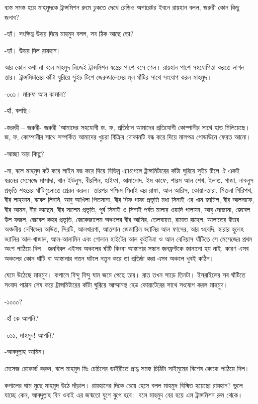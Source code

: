 \documentclass[
]{book}
\begin{document}
ব্যস্ত সমস্ত হয়ে মাহমুদকে ট্রান্সমিশন রুমে ঢুকতে দেখে রেডিও অপারেটর ইবনে রায়হান বলল, জরুরী কোন কিছু জনাব?

-হ্যাঁ। সংক্ষিপ্ত উত্তর দিয়ে মাহমুদ বলল, সব ঠিক আছে তো?

-হ্যাঁ। উত্তর দিল রায়হান।

আর কোন কথা না বলে মাহমুদ নিজেই ট্রান্সমিশন যন্ত্রের পাশে বসে গেল। রায়হান পাশে সহযোগিতা করতে লাগল তার। ট্রান্সমিটারের কাঁটা ঘুরিয়ে সুইচ টিপে জেরুজালেমের মূল ঘাঁটির সাথে সংযোগ করল মাহমুদ।

-০০১। মারুফ আল কামাল?

-হাঁ, বলছি।

-জরুরী -- জরুরী- জরুরী 'আমাদের সহযোগী জ, ফ, প্রতিষ্ঠান আমাদের প্রতিযোগী কোম্পানীর সাথে হাত মিলিয়েছে। জ, ফ, কোম্পানীর সাথে সম্পর্কিত আমাদের খুচরা বিক্রির দোকানটি বন্ধ করে দিয়ে মালপত্র গোডাউনে ফেরত আনো।

-আচ্ছা আর কিছু?

-না, বলে মাহমুদ কট করে লাইন বন্ধ করে দিয়ে বিভিন্ন এ্যাংগেলে ট্রান্সমিটারের কাঁটা ঘুরিয়ে সুইচ টিপে ঐ একই ধরনের মেসেজে মাসাদা, খান ইউনুস, বীরশিন, হাইফা, আমাদোদ, ইম কাফে, শারম আল শেখ, ইলাত, গাজা, নাবলুস প্রভৃতি শহরের ঘাঁটিগুলোতে প্রেরন করল। তারপর পশ্চিম সিনাই এর রাফা, আল আরিস, কোয়ানতারা, মিতলা গিরিপথ, বীর লাহফান, ববেল লিবনি, আবু আখিলা পিতসানা, বীর গিফ গাফা প্রভৃতি মধ্য সিনাই এর খান জামিল, বীর আলনাফে, বীর আমন, বীর কাছেম, বীর সালেম প্রভৃতি, পূর্ব সিনাই ও সিনাই পর্বত মালার ওয়াদি গালাফা, আবু দোজানা, জেবেল উল ফজল, জেবেল কহর প্রভৃতি, জেরেুজালেম অঞ্চলের বীর আসির, তেলবায়ত, রামাত রাহেল, আলাতের উত্তর অঞ্চলীয় নেগিভের আউত, সিরটি, আলখারগা, আতসান জেজারিল ভ্যালির আল ফাসের, আর ওবেদি, হারার হুলেহ ভ্যালির আল-খাজাল, আল-আলামিন এবং গোলান হাইটের আল কুইনিত্রা ও আল বেনিয়াস ঘাঁটিতে সে মেসেজের প্রথম অংশ পাঠিয়ে দিল। জনবিরল এইসব অঞ্চলের ঘাঁটি কিংবা আস্তানার সন্ধান জনফ্রন্টকে জানানো হয় নাই, কারণ এসব অঞ্চলের কোন ঘাঁটি বা আস্তানার পতন ঘটলে নতুন করে তা প্রতিষ্ঠা করা এসব অঞ্চলে খুবই কঠিন।

ঘেমে উঠেছে মাহমুদ। কপালে বিন্দু বিন্দু ঘাম জমে গেছে তার। রাত তখন সাড়ে তিনটা। ইসরাইলের সব ঘাঁটিতে সংবাদ পাঠান শেষ করে ট্রান্সমিটারের কাঁটা ঘুরিয়ে আম্মানস্থ হেড কোয়াটেরের সাথে সংযোগ করল মাহমুদ।

-১০০০?

-হাঁ কে আপনি?

-০১১, মাহমুদ! আপনি?

-আবদুল্লাহ আমিন।

মেসেজ রেকোর্ড করুন, বলে মাহমুদ মিঃ চেচিনের ডাইরীতে প্রাপ্ত সমস্ত চিঠিটা সাইমুমের বিশেষ কোডে পাঠিয়ে দিল।

কপালের ঘাম মুছে মাহমুদ উঠে দাঁড়াল। রায়হানের দিকে চেয়ে হেসে বলল মাহমুদ বিস্মিত হয়েছো রায়হান? ভুলে যাচ্ছে কেন, আবদুল্লাহ বিন ওবাই এর জন্মতো যুগে যুগে হবে। বলে মাহমুদ বের হয়ে এল ট্রান্সমিশন রুম থেকে।
\end{document}
